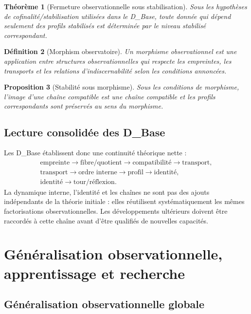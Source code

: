 \documentclass[11pt,a4paper,openany]{book}
\newtheorem{definition}{Définition}[chapter]
\newtheorem{proposition}[definition]{Proposition}
\newtheorem{theorem}[definition]{Théorème}
\begin{document}
\begin{theorem}[Fermeture observationnelle sous stabilisation]
Sous les hypothèses de cofinalité/stabilisation utilisées dans le D\_Base, toute donnée qui dépend seulement des profils stabilisés est déterminée par le niveau stabilisé correspondant.
\end{theorem}

\begin{definition}[Morphism observatoire]
Un morphisme observationnel est une application entre structures observationnelles qui respecte les empreintes, les transports et les relations d'indiscernabilité selon les conditions annoncées.
\end{definition}

\begin{proposition}[Stabilité sous morphisme]
Sous les conditions de morphisme, l'image d'une chaîne compatible est une chaîne compatible et les profils correspondants sont préservés au sens du morphisme.
\end{proposition}

\section{Lecture consolidée des D\_Base}

Les D\_Base établissent donc une continuité théorique nette :
\[
\begin{gathered}
\text{empreinte}\to\text{fibre/quotient}\to\text{compatibilité}\to\text{transport},\\
\text{transport}\to\text{ordre interne}\to\text{profil}\to\text{identité},\\
\text{identité}\to\text{tour/réflexion}.
\end{gathered}
\]
La dynamique interne, l'identité et les chaînes ne sont pas des ajouts indépendants de la théorie initiale : elles réutilisent systématiquement les mêmes factorisations observationnelles. Les développements ultérieurs doivent être raccordés à cette chaîne avant d'être qualifiés de nouvelles capacités.

\chapter{Généralisation observationnelle, apprentissage et recherche}
\section{Généralisation observationnelle globale}
\end{document}
